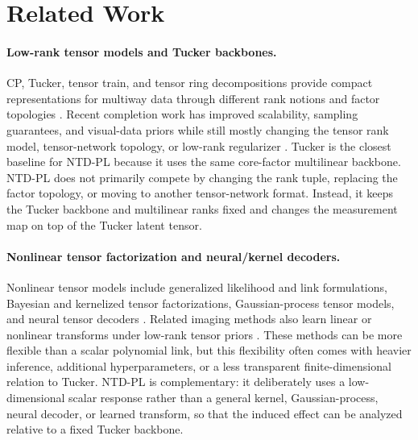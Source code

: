 \section{Related Work}

\paragraph{Low-rank tensor models and Tucker backbones.}
CP, Tucker, tensor train, and tensor ring decompositions provide compact
representations for multiway data through different rank notions and factor
topologies \citep{Kolda2009Tensor,Sidiropoulos2017TSP,
DeLathauwer2000MLSVD,oseledets2011,zhao2016tr}. Recent completion work has
improved scalability, sampling guarantees, and visual-data priors while still
mostly changing the tensor rank model, tensor-network topology, or low-rank
regularizer \citep{LiuMoitra2020TensorCompletion,Wang2021CoupledTransform,
Zheng2021FCTN}. Tucker is the closest baseline for NTD-PL because it uses the
same core-factor multilinear backbone. NTD-PL does not primarily compete by
changing the rank tuple, replacing the factor topology, or moving to another
tensor-network format. Instead, it keeps the Tucker backbone and multilinear
ranks fixed and changes the measurement map on top of the Tucker latent tensor.

\paragraph{Nonlinear tensor factorization and neural/kernel decoders.}
Nonlinear tensor models include generalized likelihood and link formulations,
Bayesian and kernelized tensor factorizations, Gaussian-process tensor models,
and neural tensor decoders
\citep{hong2020generalized,schein2016bayesian,xu2011infinite,
zhe2016distributed,liu2017deepcp,pan2020streaming,
saragadam2024deeptensor,varolgunes2023nmtucker,ahn2024neural,
Luo2024LRTFR}. Related imaging methods also learn linear or nonlinear
transforms under low-rank tensor priors
\citep{Luo2022SelfSupervisedTNN,Wang2024CoNoT,xu2024stacked}. These methods
can be more flexible than a scalar polynomial link, but this flexibility often
comes with heavier inference, additional hyperparameters, or a less transparent
finite-dimensional relation to Tucker. NTD-PL is complementary: it deliberately
uses a low-dimensional scalar response rather than a general kernel,
Gaussian-process, neural decoder, or learned transform, so that the induced
effect can be analyzed relative to a fixed Tucker backbone.

